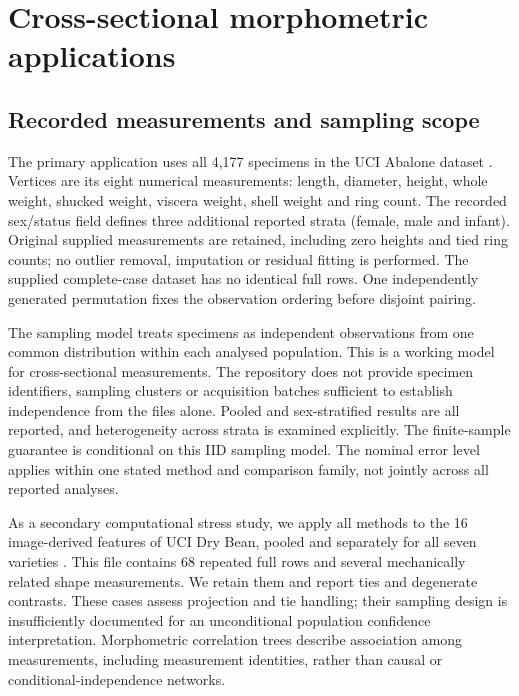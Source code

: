 


\section{Cross-sectional morphometric applications}\label{sec:crosssection}
\subsection{Recorded measurements and sampling scope}
The primary application uses all 4,177 specimens in the UCI Abalone dataset \citep{abalone1994}. Vertices are its eight numerical measurements: length, diameter, height, whole weight, shucked weight, viscera weight, shell weight and ring count. The recorded sex/status field defines three additional reported strata (female, male and infant). Original supplied measurements are retained, including zero heights and tied ring counts; no outlier removal, imputation or residual fitting is performed. The supplied complete-case dataset has no identical full rows. One independently generated permutation fixes the observation ordering before disjoint pairing.

The sampling model treats specimens as independent observations from one common distribution within each analysed population. This is a working model for cross-sectional measurements. The repository does not provide specimen identifiers, sampling clusters or acquisition batches sufficient to establish independence from the files alone. Pooled and sex-stratified results are all reported, and heterogeneity across strata is examined explicitly. The finite-sample guarantee is conditional on this IID sampling model. The nominal error level applies within one stated method and comparison family, not jointly across all reported analyses.

As a secondary computational stress study, we apply all methods to the 16 image-derived features of UCI Dry Bean, pooled and separately for all seven varieties \citep{drybean2020}. This file contains 68 repeated full rows and several mechanically related shape measurements. We retain them and report ties and degenerate contrasts. These cases assess projection and tie handling; their sampling design is insufficiently documented for an unconditional population confidence interpretation. Morphometric correlation trees describe association among measurements, including measurement identities, rather than causal or conditional-independence networks.

